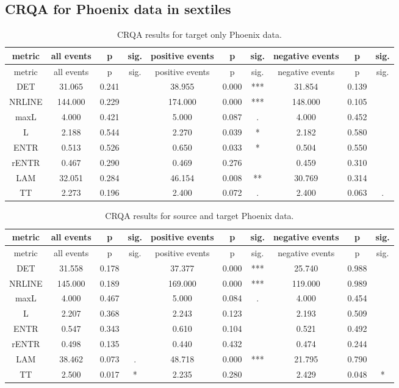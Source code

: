 \clearpage
\makeatletter
\efloat@restorefloats
\makeatother


\begin{appendix}
\hypertarget{crqa-for-phoenix-data-in-sextiles}{%
\section{CRQA for Phoenix data in
sextiles}\label{crqa-for-phoenix-data-in-sextiles}}

\begin{longtable}[]{@{}cccccccccc@{}}
\caption{CRQA results for target only Phoenix data.}\tabularnewline
\toprule
metric & all events & p & sig. & positive events & p & sig. & negative
events & p & sig.\tabularnewline
\midrule
\endfirsthead
\toprule
metric & all events & p & sig. & positive events & p & sig. & negative
events & p & sig.\tabularnewline
\midrule
\endhead
DET & 31.065 & 0.241 & & 38.955 & 0.000 & *** & 31.854 & 0.139
&\tabularnewline
NRLINE & 144.000 & 0.229 & & 174.000 & 0.000 & *** & 148.000 & 0.105
&\tabularnewline
maxL & 4.000 & 0.421 & & 5.000 & 0.087 & . & 4.000 & 0.452
&\tabularnewline
L & 2.188 & 0.544 & & 2.270 & 0.039 & * & 2.182 & 0.580 &\tabularnewline
ENTR & 0.513 & 0.526 & & 0.650 & 0.033 & * & 0.504 & 0.550
&\tabularnewline
rENTR & 0.467 & 0.290 & & 0.469 & 0.276 & & 0.459 & 0.310
&\tabularnewline
LAM & 32.051 & 0.284 & & 46.154 & 0.008 & ** & 30.769 & 0.314
&\tabularnewline
TT & 2.273 & 0.196 & & 2.400 & 0.072 & . & 2.400 & 0.063 &
.\tabularnewline
\bottomrule
\end{longtable}

\begin{longtable}[]{@{}cccccccccc@{}}
\caption{CRQA results for source and target Phoenix
data.}\tabularnewline
\toprule
metric & all events & p & sig. & positive events & p & sig. & negative
events & p & sig.\tabularnewline
\midrule
\endfirsthead
\toprule
metric & all events & p & sig. & positive events & p & sig. & negative
events & p & sig.\tabularnewline
\midrule
\endhead
DET & 31.558 & 0.178 & & 37.377 & 0.000 & *** & 25.740 & 0.988
&\tabularnewline
NRLINE & 145.000 & 0.189 & & 169.000 & 0.000 & *** & 119.000 & 0.989
&\tabularnewline
maxL & 4.000 & 0.467 & & 5.000 & 0.084 & . & 4.000 & 0.454
&\tabularnewline
L & 2.207 & 0.368 & & 2.243 & 0.123 & & 2.193 & 0.509 &\tabularnewline
ENTR & 0.547 & 0.343 & & 0.610 & 0.104 & & 0.521 & 0.492
&\tabularnewline
rENTR & 0.498 & 0.135 & & 0.440 & 0.432 & & 0.474 & 0.244
&\tabularnewline
LAM & 38.462 & 0.073 & . & 48.718 & 0.000 & *** & 21.795 & 0.790
&\tabularnewline
TT & 2.500 & 0.017 & * & 2.235 & 0.280 & & 2.429 & 0.048 &
*\tabularnewline
\bottomrule
\end{longtable}


\end{appendix}
